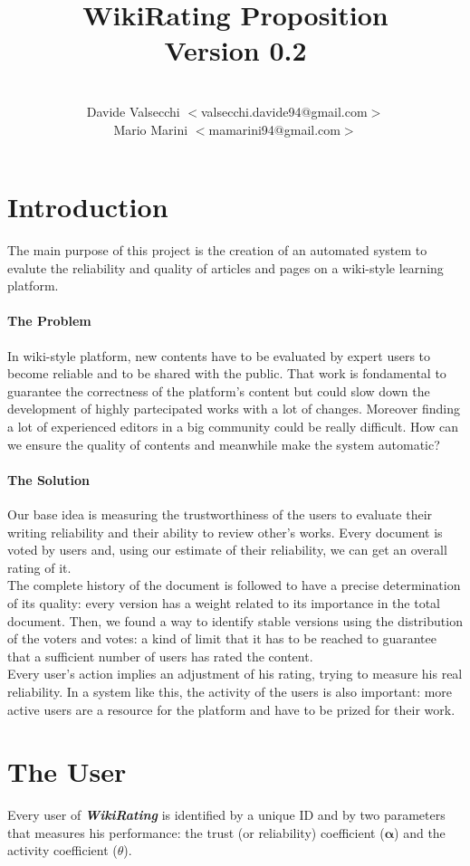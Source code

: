 \documentclass[a4paper,11pt]{article}
\title{\textbf{WikiRating Proposition\\Version 0.2}}
\author{\\Davide Valsecchi $<$valsecchi.davide94@gmail.com$>$
\\Mario Marini $<$mamarini94@gmail.com$>$}
\newcommand{\wir}{\textbf{\textit{WikiRating }}}
\begin{document}
\maketitle
\newpage
\tableofcontents
\newpage

\section{Introduction}

The main purpose of this project is the creation of an automated system to evalute the reliability and quality of articles and pages on a wiki-style learning platform.
\paragraph{The Problem}
In wiki-style platform, new contents have to be evaluated by expert users to become reliable and to be shared with the public. That work is fondamental to guarantee the
correctness of the platform's content but could slow down the development of highly
partecipated works with a lot of changes. Moreover finding a lot of experienced editors  
in a big community could be really difficult. How can we ensure the quality of contents 
and meanwhile make the system automatic?
\paragraph{The Solution}
Our base idea is measuring the trustworthiness of the users to evaluate their writing reliability and their ability to review other's works. Every document is voted by users and, using our estimate of their reliability, we can get an overall rating of it. 
\\The complete history of the document is followed to have a precise determination of its quality: every version has a weight related to its importance in the total document. Then, we found a way to identify stable versions using the distribution of the voters and votes: a kind of limit that it has to be reached to guarantee that a sufficient number of users has rated the content. 
\\Every user's action implies an adjustment of his rating, trying to measure his real reliability. In a system like this, the activity of the users is also important: more active users are a resource for the platform and have to be prized for their work.

\newpage
\section{The User} \label{sec:user}
Every user of \wir is identified by a unique ID and by two parameters that measures his 
performance: the trust (or reliability) coefficient ($\mathbf{\alpha}$) and the activity 
coefficient ($\theta$).
\end{document}
